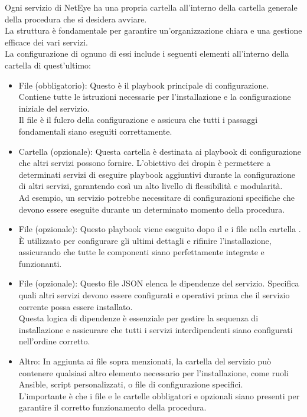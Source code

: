 Ogni servizio di NetEye ha una propria cartella all'interno della cartella
generale della procedura che si desidera avviare.\\ La struttura è fondamentale
per garantire un'organizzazione chiara e una gestione efficace dei vari servizi.\\
La configurazione di ognuno di essi include i seguenti elementi all'interno
della cartella di quest'ultimo:
\begin{itemize}
  \item File  (obbligatorio): Questo è il playbook principale di configurazione.
    Contiene tutte le istruzioni necessarie per l'installazione e la
    configurazione iniziale del servizio.\\ Il file  è il fulcro della
    configurazione e assicura che tutti i passaggi fondamentali siano eseguiti correttamente.

  \item Cartella  (opzionale): Questa cartella è destinata ai playbook
    di configurazione che altri servizi possono fornire. L'obiettivo dei dropin
    è permettere a determinati servizi di eseguire playbook aggiuntivi durante
    la configurazione di altri servizi, garantendo così un alto livello di flessibilità
    e modularità.\\ Ad esempio, un servizio potrebbe necessitare di
    configurazioni specifiche che devono essere eseguite durante un determinato
    momento della procedura.

  \item File  (opzionale): Questo playbook viene eseguito dopo il
     e i file nella cartella .\\ È utilizzato per
    configurare gli ultimi dettagli e rifinire l'installazione, assicurando che
    tutte le componenti siano perfettamente integrate e funzionanti.

  \item File  (opzionale): Questo file JSON elenca le dipendenze
    del servizio. Specifica quali altri servizi devono essere configurati e
    operativi prima che il servizio corrente possa essere installato.\\ Questa
    logica di dipendenze è essenziale per gestire la sequenza di installazione e
    assicurare che tutti i servizi interdipendenti siano configurati nell'ordine
    corretto.

  \item Altro: In aggiunta ai file sopra menzionati, la cartella del servizio può
    contenere qualsiasi altro elemento necessario per l'installazione, come
    ruoli Ansible, script personalizzati, o file di configurazione specifici.\\
    L'importante è che i file e le cartelle obbligatori e opzionali siano
    presenti per garantire il corretto funzionamento della procedura.
\end{itemize}

